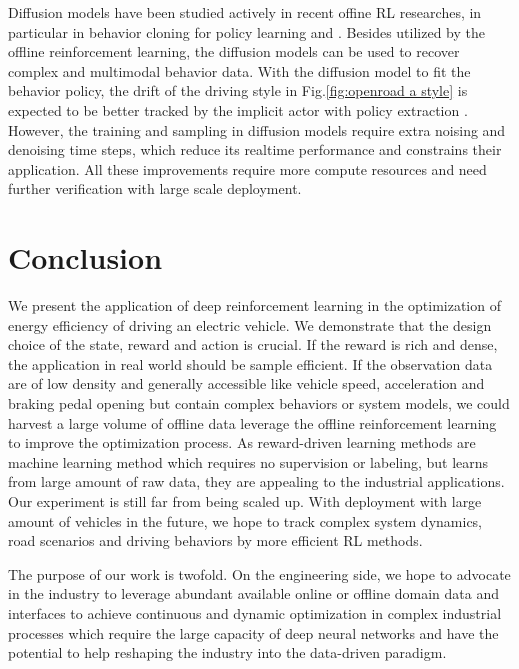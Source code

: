 \documentclass[conference]{IEEEtran}
\begin{document}
Diffusion models have been studied actively in recent offine RL researches, in particular in behavior cloning for policy learning \parencite{janner22:_plann_diffus_flexib_behav_synth} \parencite{wang22:_diffus_polic_expres_polic_class} and \parencite{hansen-estruch23:_idql} \parencite{psenka23:_learn_diffus_model_polic_rewar}. Besides utilized by the offline reinforcement learning, the diffusion models can be used to recover complex and multimodal behavior data. With the diffusion model to fit the behavior policy, the drift of the driving style in Fig.\@\ref{fig:openroad a style} is expected to be better tracked by the implicit actor with policy extraction \parencite{hansen-estruch23:_idql}. However, the training and sampling in diffusion models require extra noising and denoising time steps, which reduce its realtime performance and constrains their application. All these improvements require more compute resources and need further verification with large scale deployment.

\section{Conclusion}\label{sec:conclusion}

We present the application of deep reinforcement learning in the optimization of energy efficiency of driving an electric vehicle. We demonstrate that the design choice of the state, reward and action is crucial. If the reward is rich and dense, the application in real world should be sample efficient. If the observation data are of low density and generally accessible like vehicle speed, acceleration and braking pedal opening but contain complex behaviors or system models, we could harvest a large volume of offline data leverage the offline reinforcement learning to improve the optimization process. As reward-driven learning methods are machine learning method which requires no supervision or labeling, but learns from large amount of raw data, they are appealing to the industrial applications. Our experiment is still far from being scaled up. With deployment with large amount of vehicles in the future, we hope to track complex system dynamics, road scenarios and driving behaviors by more efficient RL methods.

The purpose of our work is twofold. On the engineering side, we hope to advocate in the industry to leverage abundant available online or offline domain data and interfaces to achieve continuous and dynamic optimization in complex industrial processes which require the large capacity of deep neural networks and have the potential to help reshaping the industry into the data-driven paradigm.
\end{document}
